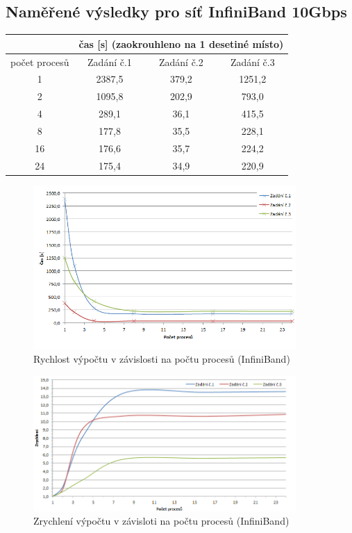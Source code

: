 \documentclass[12pt]{article}
\begin{document}
\subsection{Naměřené výsledky pro síť InfiniBand 10Gbps}
\begin{center}
\begin{tabular}{|c|c|c|c|}
\hline 
 & \multicolumn{3}{c|}{čas [s] (zaokrouhleno na 1 desetiné místo)} \\ 
\hline 
počet procesů & Zadání č.1 & Zadání č.2 & Zadání č.3 \\ 
\hline 
\hline 
1 & 2387,5 & 379,2 & 1251,2 \\ 
\hline 
2 & 1095,8 & 202,9 & 793,0 \\ 
\hline 
4 & 289,1 & 36,1 & 415,5 \\ 
\hline 
8 & 177,8 & 35,5 & 228,1 \\ 
\hline 
16 & 176,6 & 35,7 & 224,2 \\ 
\hline 
24 & 175,4 & 34,9 & 220,9 \\ 
\hline 
\end{tabular} 
\end{center}


\begin{figure}[h]
\begin{center}
\includegraphics[width=100mm]{cpu_time_inifiniband.png}
\caption{Rychlost výpočtu v závislosti na počtu procesů (InfiniBand)}
\label{fig:ct_inifini}
\end{center}
\end{figure}

\begin{figure}[h]
\begin{center}
\includegraphics[width=100mm]{speedup_infini.png}
\caption{Zrychlení výpočtu v závisloti na počtu procesů (InfiniBand)}
\label{fig:speedup_inifini}
\end{center}
\end{figure}
\end{document}
